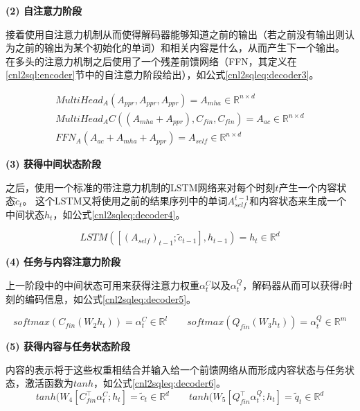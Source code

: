 \textbf{(2) 自注意力阶段}

接着使用自注意力机制\cite{vaswani2017attention}从而使得解码器能够知道之前的输出（若之前没有输出则认为之前的输出为某个初始化的单词）和相关内容是什么，从而产生下一个输出。
在多头的注意力机制之后使用了一个残差前馈网络（FFN，其定义在\ref{cnl2sql:encoder}节中的自注意力阶段给出），如公式\ref{cnl2sqleq:decoder3}。

\begin{gather}
  \label{cnl2sqleq:decoder3}
  MultiHead_A(A_{ppr},A_{ppr},A_{ppr}) = A_{mha} \in \mathbb{R}^{n \times d}\\
  MultiHead_{A}C((A_{mha} + A_{ppr}),C_{fin},C_{fin}) = A_{ac} \in \mathbb{R}^{n \times d}\\
  FFN_A(A_{ac} + A_{mha} + A_{ppr}) = A_{self} \in \mathbb{R}^{n \times d}
\end{gather}

\textbf{(3) 获得中间状态阶段}

之后，使用一个标准的带注意力机制的LSTM网络来对每个时刻$t$产生一个内容状态$\widetilde{c}_t$。
这个LSTM又将使用之前的结果序列中的单词$A^{t-1}_{self}$和内容状态来生成一个中间状态$h_t$，如公式\ref{cnl2sqleq:decoder4}。

\begin{equation}
  \label{cnl2sqleq:decoder4}
  LSTM([(A_{self})_{t-1};\widetilde{c}_{t-1}],h_{t-1})= h_t \in \mathbb{R}^{d} 
\end{equation}

\textbf{(4) 任务与内容注意力阶段}

上一阶段中的中间状态可用来获得注意力权重$\alpha^C_t$以及$\alpha^Q_t$，解码器从而可以获得$t$时刻的编码信息，如公式\ref{cnl2sqleq:decoder5}。

\begin{equation}
  \label{cnl2sqleq:decoder5}
  softmax(C_{fin}(W_2 h_t)) = \alpha^C_t \in \mathbb{R}^{l} \qquad softmax(Q_{fin}(W_3 h_t)) = \alpha^Q_t \in \mathbb{R}^{m}
\end{equation}

\textbf{(5) 获得内容与任务状态阶段}

内容的表示将于这些权重相结合并输入给一个前馈网络从而形成内容状态与任务状态，激活函数为$tanh$，如公式\ref{cnl2sqleq:decoder6}。
\begin{equation}
  \label{cnl2sqleq:decoder6}
  tanh(W_4[C^{\top}_{fin}\alpha^C_t;h_t] = \widetilde{c}_{t} \in \mathbb{R}^{d} \qquad tanh(W_5[Q^{\top}_{fin}\alpha^Q_t;h_t] = \widetilde{q}_{t} \in \mathbb{R}^{d}
\end{equation}

